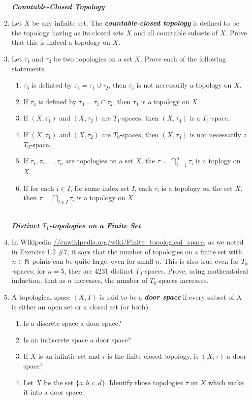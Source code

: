 \documentclass[10pt,a4paper]{report}
\newcommand{\SPECIAL}[1]{\begin{center}
	{\Large \textbf{\textit{\\#1}} }
\end{center}
}
\begin{document}
\begin{enumerate}
	\SPECIAL{Countable-Closed Topology}

\item Let $X$ be any infinite set.  The \textbf{\textit{countable-closed topology}} is defined to be the topology having as its closed sets $X$ and all countable subsets of $X$.  Prove that this is indeed a topology on $X$.

\item Let $\tau_1$ and $\tau_2$ be two topologies on a set $X$.  Prove each of the following statements.
\begin{enumerate}[label=(\roman*)]
	\item $\tau_3$ is definted by $\tau_3 = \tau_1 \cup \tau_2$, then $\tau_3$ is not necessarily a topology on $X$. 
	\item If $\tau_4$ is defined by $\tau_4 = \tau_1 \cap \tau_2$, then $\tau_4$ is a topology on $X$.
	\item If $(X,\tau_1)$ and $(X,\tau_2)$ are $T_1$-spaces, then $(X,\tau_4)$ is a $T_1$-space.
	\item If $(X,\tau_1)$ and $(X,\tau_2)$ are $T_0$-spaces, then $(X,\tau_4)$ is not necessarily a $T_0$-space.
	\item If $\tau_1, \tau_2, \dots, \tau_n$ are topologies on a set $X$, the $\tau = \bigcap_{i=1}^n \tau_i$ is a toplogy on $X$.
	\item If for each $i \in I$, for some index set $I$, each $\tau_i$ is a topology on the set $X$, then $\tau = \bigcap_{i\in I} \tau_i$ is a topology on $X$.
\end{enumerate}

\SPECIAL{Distinct $T_1$-topologies on a Finite Set}

\item In Wikipedia \url{//enwikipedia.org/wiki/Finite_topological_space}, as we noted in Exercise 1.2 \#7, it says that the number of topologies on a finite set with $n \in \mathbb{N}$ points can be quite large, even for small $n$.  This is also true even for $T_0$-spaces; for $n=5$, ther are 4231 distinct $T_0$-spaces.  Prove, using mathemtaical induction, that as $n$ increases, the number of $T_0$-spaces increases.

\item A topological space $(X,T)$ is said to be a \textbf{\textit{door space}} if every subset of $X$ is either an open set or a closed set (or both).
\begin{enumerate}[label=(\roman*)]
	\item Is a discrete space a door space?
	\item Is an indiscrete space a door space?
	\item If $X$ is an infintie set and $\tau$ is the finite-closed topology, is $(X,\tau)$ a door space?
	\item Let $X$ be the set $\{a,b,c,d\}$.  Identify those topologies $\tau$ on $X$ which make it into a door space.
\end{enumerate}


\end{enumerate}
\end{document}
